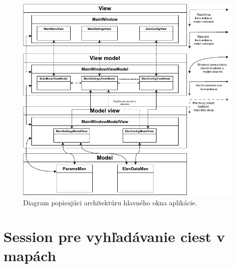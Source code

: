 \begin{figure}[h]\centering
\includegraphics[]{img/hlavne_okno}
\caption{Diagram popisujúci architektúru hlavného okna aplikácie.} 
\label{obr03:hlavne_okno}
\end{figure}

\pagebreak

\section{Session pre vyhľadávanie ciest v mapách}

